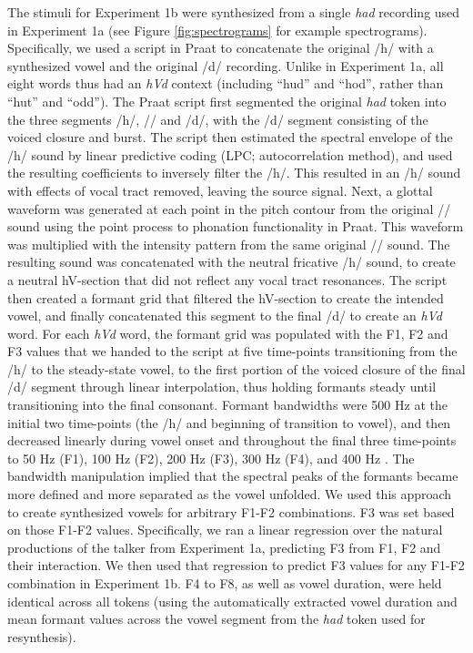 \documentclass[preprint]{JASA}
\begin{document}
The stimuli for Experiment 1b were synthesized from a single \emph{had} recording used in Experiment 1a (see Figure \ref{fig:spectrograms} for example spectrograms). Specifically, we used a script \citep[based on descriptions in][]{wade2007} in Praat \citep{boersma-weenink2022} to concatenate the original /h/ with a synthesized vowel and the original /d/ recording. Unlike in Experiment 1a, all eight words thus had an \emph{hVd} context (including ``hud'' and ``hod'', rather than ``hut'' and ``odd''). The Praat script first segmented the original \emph{had} token into the three segments /h/, /\textipa{\ae}/ and /d/, with the /d/ segment consisting of the voiced closure and burst. The script then estimated the spectral envelope of the /h/ sound by linear predictive coding (LPC; autocorrelation method), and used the resulting coefficients to inversely filter the /h/. This resulted in an /h/ sound with effects of vocal tract removed, leaving the source signal. Next, a glottal waveform was generated at each point in the pitch contour from the original /\textipa{\ae}/ sound using the point process to phonation functionality in Praat. This waveform was multiplied with the intensity pattern from the same original /\textipa{\ae}/ sound. The resulting sound was concatenated with the neutral fricative /h/ sound, to create a neutral hV-section that did not reflect any vocal tract resonances. The script then created a formant grid that filtered the hV-section to create the intended vowel, and finally concatenated this segment to the final /d/ to create an \emph{hVd} word. For each \emph{hVd} word, the formant grid was populated with the F1, F2 and F3 values that we handed to the script at five time-points transitioning from the /h/ to the steady-state vowel, to the first portion of the voiced closure of the final /d/ segment through linear interpolation, thus holding formants steady until transitioning into the final consonant. Formant bandwidths were 500 Hz at the initial two time-points (the /h/ and beginning of transition to vowel), and then decreased linearly during vowel onset and throughout the final three time-points to 50 Hz (F1), 100 Hz (F2), 200 Hz (F3), 300 Hz (F4), and 400 Hz \citep[F5-F8, following][]{wade2007}. The bandwidth manipulation implied that the spectral peaks of the formants became more defined and more separated as the vowel unfolded. We used this approach to create synthesized vowels for arbitrary F1-F2 combinations. F3 was set based on those F1-F2 values. Specifically, we ran a linear regression over the natural productions of the talker from Experiment 1a, predicting F3 from F1, F2 and their interaction. We then used that regression to predict F3 values for any F1-F2 combination in Experiment 1b. F4 to F8, as well as vowel duration, were held identical across all tokens (using the automatically extracted vowel duration and mean formant values across the vowel segment from the \emph{had} token used for resynthesis).
\end{document}
